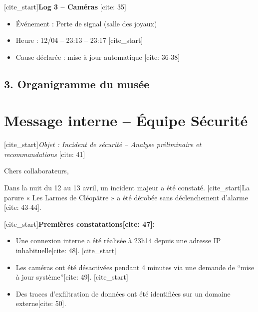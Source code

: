 \documentclass[a4paper,11pt]{article}
\begin{document}
[cite_start]\textbf{Log 3 – Caméras} [cite: 35]
\begin{itemize}
    \item Événement : Perte de signal (salle des joyaux)
    \item Heure : 12/04 – 23:13 – 23:17
    [cite_start]\item Cause déclarée : mise à jour automatique [cite: 36-38]
\end{itemize}

\subsection{3. Organigramme du musée}
\begin{center}
\end{center}

\section{Message interne – Équipe Sécurité}
[cite_start]\textit{Objet : Incident de sécurité – Analyse préliminaire et recommandations} [cite: 41]

Chers collaborateurs,

Dans la nuit du 12 au 13 avril, un incident majeur a été constaté. [cite_start]La parure « Les Larmes de Cléopâtre » a été dérobée sans déclenchement d’alarme [cite: 43-44].

[cite_start]\textbf{Premières constatations[cite: 47]:}
\begin{itemize}
    [cite_start]\item Une connexion interne a été réalisée à 23h14 depuis une adresse IP inhabituelle[cite: 48].
    [cite_start]\item Les caméras ont été désactivées pendant 4 minutes via une demande de ``mise à jour système''[cite: 49].
    [cite_start]\item Des traces d’exfiltration de données ont été identifiées sur un domaine externe[cite: 50].
\end{itemize}
\end{document}
